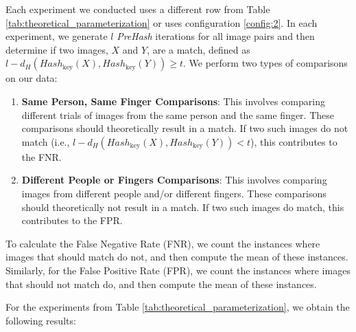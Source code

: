 Each experiment we conducted uses a different row from Table \ref{tab:theoretical_parameterization} or uses configuration \ref{config:2}. In each experiment, we generate \( l \) \textit{PreHash} iterations for all image pairs and then determine if two images, \(X\) and \(Y\), are a match, defined as \( l - d_H(Hash_{\text{key}}(X), Hash_{\text{key}}(Y)) \geq t \). We perform two types of comparisons on our data:

\begin{enumerate}
    \item \textbf{Same Person, Same Finger Comparisons}: This involves comparing different trials of images from the same person and the same finger. These comparisons should theoretically result in a match. If two such images do not match (i.e., \( l - d_H(Hash_{\text{key}}(X), Hash_{\text{key}}(Y)) < t \)), this contributes to the FNR.
    \item \textbf{Different People or Fingers Comparisons}: This involves comparing images from different people and/or different fingers. These comparisons should theoretically not result in a match. If two such images do match, this contributes to the FPR.
\end{enumerate}

To calculate the False Negative Rate (FNR), we count the instances where images that should match do not, and then compute the mean of these instances. Similarly, for the False Positive Rate (FPR), we count the instances where images that should not match do, and then compute the mean of these instances.

For the experiments from Table \ref{tab:theoretical_parameterization}, we obtain the following results:

